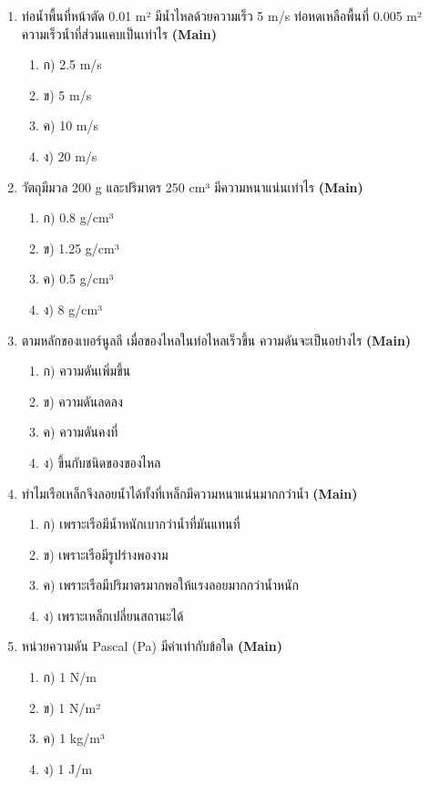 \documentclass[12pt]{article}
\begin{document}
\begin{enumerate}[label=\arabic*.]
\item ท่อน้ำพื้นที่หน้าตัด 0.01 m² มีน้ำไหลด้วยความเร็ว 5 m/s ท่อหดเหลือพื้นที่ 0.005 m² ความเร็วน้ำที่ส่วนแคบเป็นเท่าไร \hfill \textbf{\small (Main)}
\begin{enumerate}[label=)]
\item ก) 2.5 m/s
\item ข) 5 m/s
\item ค) 10 m/s
\item ง) 20 m/s
\end{enumerate}
\item วัตถุมีมวล 200 g และปริมาตร 250 cm³ มีความหนาแน่นเท่าไร \hfill \textbf{\small (Main)}
\begin{enumerate}[label=)]
\item ก) 0.8 g/cm³
\item ข) 1.25 g/cm³
\item ค) 0.5 g/cm³
\item ง) 8 g/cm³
\end{enumerate}
\item ตามหลักของเบอร์นูลลี เมื่อของไหลในท่อไหลเร็วขึ้น ความดันจะเป็นอย่างไร \hfill \textbf{\small (Main)}
\begin{enumerate}[label=)]
\item ก) ความดันเพิ่มขึ้น
\item ข) ความดันลดลง
\item ค) ความดันคงที่
\item ง) ขึ้นกับชนิดของของไหล
\end{enumerate}
\item ทำไมเรือเหล็กจึงลอยน้ำได้ทั้งที่เหล็กมีความหนาแน่นมากกว่าน้ำ \hfill \textbf{\small (Main)}
\begin{enumerate}[label=)]
\item ก) เพราะเรือมีน้ำหนักเบากว่าน้ำที่มันแทนที่
\item ข) เพราะเรือมีรูปร่างพองาม
\item ค) เพราะเรือมีปริมาตรมากพอให้แรงลอยมากกว่าน้ำหนัก
\item ง) เพราะเหล็กเปลี่ยนสถานะได้
\end{enumerate}
\item หน่วยความดัน Pascal (Pa) มีค่าเท่ากับข้อใด \hfill \textbf{\small (Main)}
\begin{enumerate}[label=)]
\item ก) 1 N/m
\item ข) 1 N/m²
\item ค) 1 kg/m³
\item ง) 1 J/m
\end{enumerate}

\end{enumerate}
\end{document}
